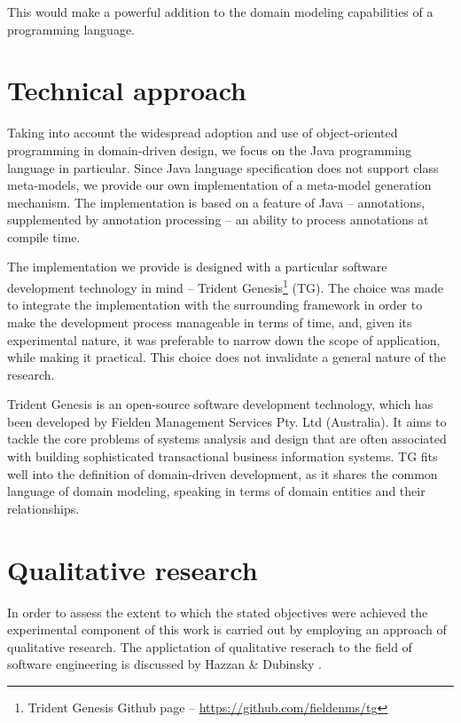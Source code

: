 This would make a powerful addition to the domain modeling capabilities of a programming language.

\section{Technical approach}
Taking into account the widespread adoption and use of object-oriented programming in domain-driven design, we focus on the Java programming language in particular.
Since Java language specification does not support class meta-models, we provide our own implementation of a meta-model generation mechanism. 
The implementation is based on a feature of Java -- annotations, supplemented by annotation processing -- an ability to process annotations at compile time.

\n

The implementation we provide is designed with a particular software development technology in mind – Trident Genesis\footnote{Trident Genesis Github page -- \url{https://github.com/fieldenms/tg}} (TG). The choice was made to integrate the implementation with the surrounding framework in order to make the development process manageable in terms of time, and, given its experimental nature, it was preferable to narrow down the scope of application, while making it practical. This choice does not invalidate a general nature of the research.

\n

Trident Genesis is an open-source software development technology, which has been developed by Fielden Management Services Pty. Ltd (Australia).
It aims to tackle the core problems of systems analysis and design that are often associated with building sophisticated transactional business information systems.
TG fits well into the definition of domain-driven development, as it shares the common language of domain modeling, speaking in terms of domain entities and their relationships.

\section {Qualitative research}
In order to assess the extent to which the stated objectives were achieved the experimental component of this work is carried out by employing an approach of qualitative research.
The applictation of qualitative reserach to the field of software engineering is discussed by Hazzan \& Dubinsky \cite{hazzan}.

\n


